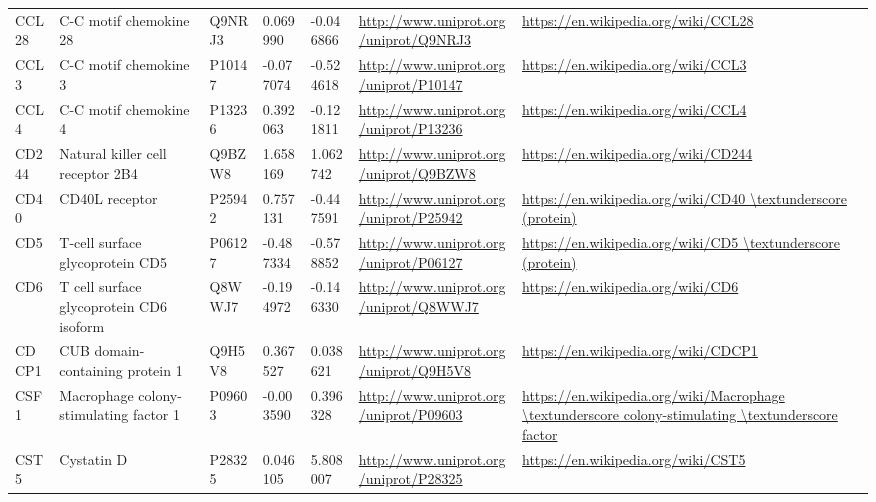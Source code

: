 \begin{table}[H]
{\begin{tabular}{ lllllll }
        \multicolumn{1}{l|}{ CCL28 } &  C-C motif chemokine 28   & Q9NRJ3   & 0.069990   & -0.046866   & \url{http://www.uniprot.org/uniprot/Q9NRJ3}   & \url{https://en.wikipedia.org/wiki/CCL28}          \\ 
        \multicolumn{1}{l|}{ CCL3 } &  C-C motif chemokine 3   & P10147   & -0.077074   & -0.524618   & \url{http://www.uniprot.org/uniprot/P10147}   & \url{https://en.wikipedia.org/wiki/CCL3}          \\ 
        \multicolumn{1}{l|}{ CCL4 } &  C-C motif chemokine 4   & P13236   & 0.392063   & -0.121811   & \url{http://www.uniprot.org/uniprot/P13236}   & \url{https://en.wikipedia.org/wiki/CCL4}          \\ 
        \multicolumn{1}{l|}{ CD244 } &  Natural killer cell receptor 2B4   & Q9BZW8   & 1.658169   & 1.062742   & \url{http://www.uniprot.org/uniprot/Q9BZW8}   & \url{https://en.wikipedia.org/wiki/CD244}          \\ 
        \multicolumn{1}{l|}{ CD40 } &  CD40L receptor   & P25942   & 0.757131   & -0.447591   & \url{http://www.uniprot.org/uniprot/P25942}   & \url{https://en.wikipedia.org/wiki/CD40 \textunderscore (protein)}          \\ 
        \multicolumn{1}{l|}{ CD5 } &  T-cell surface glycoprotein CD5   & P06127   & -0.487334   & -0.578852   & \url{http://www.uniprot.org/uniprot/P06127}   & \url{https://en.wikipedia.org/wiki/CD5 \textunderscore (protein)}          \\ 
        \multicolumn{1}{l|}{ CD6 } &  T cell surface glycoprotein CD6 isoform   & Q8WWJ7   & -0.194972   & -0.146330   & \url{http://www.uniprot.org/uniprot/Q8WWJ7}   & \url{https://en.wikipedia.org/wiki/CD6}          \\ 
        \multicolumn{1}{l|}{ CDCP1 } &  CUB domain-containing protein 1   & Q9H5V8   & 0.367527   & 0.038621   & \url{http://www.uniprot.org/uniprot/Q9H5V8}   & \url{https://en.wikipedia.org/wiki/CDCP1}          \\ 
        \multicolumn{1}{l|}{ CSF1 } &  Macrophage colony-stimulating factor 1   & P09603   & -0.003590   & 0.396328   & \url{http://www.uniprot.org/uniprot/P09603}   & \url{https://en.wikipedia.org/wiki/Macrophage \textunderscore colony-stimulating \textunderscore factor}          \\ 
        \multicolumn{1}{l|}{ CST5 } &  Cystatin D   & P28325   & 0.046105   & 5.808007   & \url{http://www.uniprot.org/uniprot/P28325}   & \url{https://en.wikipedia.org/wiki/CST5}          \\ 

\end{tabular}}
\end{table}
